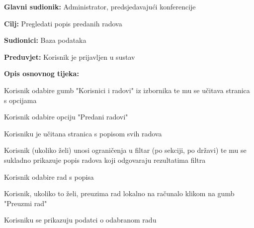 					
					\noindent {}
					\begin{packed_item}
						
						\item \textbf{Glavni sudionik: } Administrator, predsjedavajući konferencije
						\item  \textbf{Cilj:} Pregledati popis predanih radova
						\item  \textbf{Sudionici:} Baza podataka
						\item  \textbf{Preduvjet:} Korisnik je prijavljen u sustav
						\item  \textbf{Opis osnovnog tijeka:}
						
						\item[] \begin{packed_enum}
							\item Korisnik odabire gumb "Korisnici i radovi" iz izbornika te mu se učitava stranica s opcijama
							\item Korisnik odabire opciju "Predani radovi" 
							\item Korisniku je učitana stranica s popisom svih radova
							\item Korisnik (ukoliko želi) unosi ograničenja u filtar (po sekciji, po državi) te mu se sukladno prikazuje popis radova koji odgovaraju rezultatima filtra
							\item Korisnik odabire rad s popisa
							\item Korisnik, ukoliko to želi, preuzima rad lokalno na računalo klikom na gumb "Preuzmi rad"
							\item Korisniku se prikazuju podatci o odabranom radu
							
							
							
						\end{packed_enum}                
						
					\end{packed_item}
					
					
					
